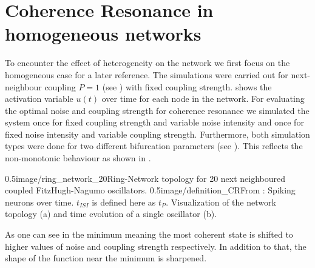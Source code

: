 \section{Coherence Resonance in homogeneous networks}

To encounter the effect of heterogeneity on the network we first focus on the homogeneous case  for a later reference. The simulations were carried out for next-neighbour coupling $P=1$ (see ) with fixed coupling strength.  shows the activation variable $u(t)$ over time for each node in the network. For evaluating the optimal noise and coupling strength for coherence resonance we simulated the system once for fixed coupling strength and variable noise intensity and once for fixed noise intensity and variable coupling strength. Furthermore, both simulation types were done for two different bifurcation parameters (see ). This reflects the non-monotonic behaviour as shown in \cite{Masoliver2017}. 

	{0.5}{image/ring_network_20}{Ring-Network topology for 20 next neighboured coupled FitzHugh-Nagumo oscillators.}
	{0.5}{image/definition_CR}{From \cite{Pikovsky1997}: Spiking neurons over time. $t_{ISI}$ is defined here as $t_P$.}{
	Visualization of the network topology (a) and time evolution of a single oscillator (b).
}

\newpage


As one can see in  the minimum meaning the most coherent state is shifted to higher values of noise and coupling strength respectively. In addition to that, the shape of the function near the minimum is sharpened. 

